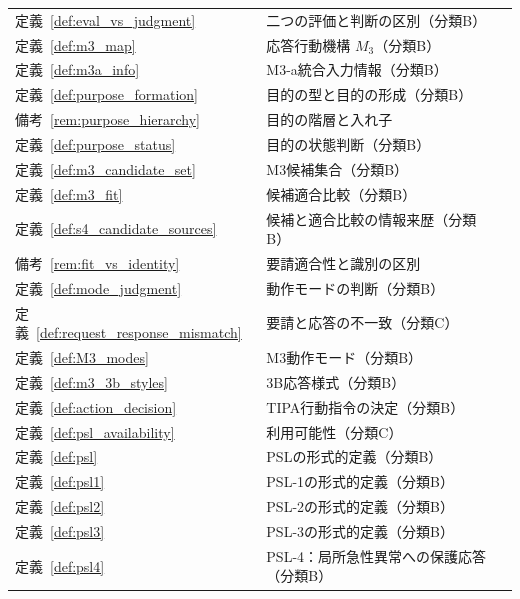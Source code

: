 \begin{longtable}{p{2.4cm} p{10.4cm} r}
定義~\ref{def:eval_vs_judgment} & 二つの評価と判断の区別（分類B） & \pageref{def:eval_vs_judgment} \\
定義~\ref{def:m3_map} & 応答行動機構 $M_3$（分類B） & \pageref{def:m3_map} \\
定義~\ref{def:m3a_info} & M3-a統合入力情報（分類B） & \pageref{def:m3a_info} \\
定義~\ref{def:purpose_formation} & 目的の型と目的の形成（分類B） & \pageref{def:purpose_formation} \\
備考~\ref{rem:purpose_hierarchy} & 目的の階層と入れ子 & \pageref{rem:purpose_hierarchy} \\
定義~\ref{def:purpose_status} & 目的の状態判断（分類B） & \pageref{def:purpose_status} \\
定義~\ref{def:m3_candidate_set} & M3候補集合（分類B） & \pageref{def:m3_candidate_set} \\
定義~\ref{def:m3_fit} & 候補適合比較（分類B） & \pageref{def:m3_fit} \\
定義~\ref{def:s4_candidate_sources} & 候補と適合比較の情報来歴（分類B） & \pageref{def:s4_candidate_sources} \\
備考~\ref{rem:fit_vs_identity} & 要請適合性と識別の区別 & \pageref{rem:fit_vs_identity} \\
定義~\ref{def:mode_judgment} & 動作モードの判断（分類B） & \pageref{def:mode_judgment} \\
定義~\ref{def:request_response_mismatch} & 要請と応答の不一致（分類C） & \pageref{def:request_response_mismatch} \\
定義~\ref{def:M3_modes} & M3動作モード（分類B） & \pageref{def:M3_modes} \\
定義~\ref{def:m3_3b_styles} & 3B応答様式（分類B） & \pageref{def:m3_3b_styles} \\
定義~\ref{def:action_decision} & TIPA行動指令の決定（分類B） & \pageref{def:action_decision} \\
定義~\ref{def:psl_availability} & 利用可能性（分類C） & \pageref{def:psl_availability} \\
定義~\ref{def:psl} & PSLの形式的定義（分類B） & \pageref{def:psl} \\
定義~\ref{def:psl1} & PSL-1の形式的定義（分類B） & \pageref{def:psl1} \\
定義~\ref{def:psl2} & PSL-2の形式的定義（分類B） & \pageref{def:psl2} \\
定義~\ref{def:psl3} & PSL-3の形式的定義（分類B） & \pageref{def:psl3} \\
定義~\ref{def:psl4} & PSL-4：局所急性異常への保護応答（分類B） & \pageref{def:psl4} \\

\end{longtable}
